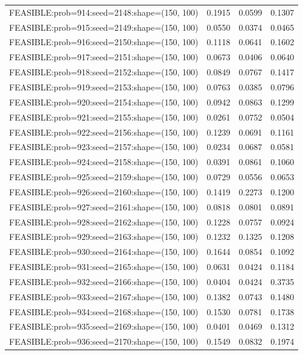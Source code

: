 \begin{longtable}{lccc}
FEASIBLE:prob=914:seed=2148:shape=(150, 100) & 0.1915 & 0.0599 & 0.1307 \\
FEASIBLE:prob=915:seed=2149:shape=(150, 100) & 0.0550 & 0.0374 & 0.0465 \\
FEASIBLE:prob=916:seed=2150:shape=(150, 100) & 0.1118 & 0.0641 & 0.1602 \\
FEASIBLE:prob=917:seed=2151:shape=(150, 100) & 0.0673 & 0.0406 & 0.0640 \\
FEASIBLE:prob=918:seed=2152:shape=(150, 100) & 0.0849 & 0.0767 & 0.1417 \\
FEASIBLE:prob=919:seed=2153:shape=(150, 100) & 0.0763 & 0.0385 & 0.0796 \\
FEASIBLE:prob=920:seed=2154:shape=(150, 100) & 0.0942 & 0.0863 & 0.1299 \\
FEASIBLE:prob=921:seed=2155:shape=(150, 100) & 0.0261 & 0.0752 & 0.0504 \\
FEASIBLE:prob=922:seed=2156:shape=(150, 100) & 0.1239 & 0.0691 & 0.1161 \\
FEASIBLE:prob=923:seed=2157:shape=(150, 100) & 0.0234 & 0.0687 & 0.0581 \\
FEASIBLE:prob=924:seed=2158:shape=(150, 100) & 0.0391 & 0.0861 & 0.1060 \\
FEASIBLE:prob=925:seed=2159:shape=(150, 100) & 0.0729 & 0.0556 & 0.0653 \\
FEASIBLE:prob=926:seed=2160:shape=(150, 100) & 0.1419 & 0.2273 & 0.1200 \\
FEASIBLE:prob=927:seed=2161:shape=(150, 100) & 0.0818 & 0.0801 & 0.0891 \\
FEASIBLE:prob=928:seed=2162:shape=(150, 100) & 0.1228 & 0.0757 & 0.0924 \\
FEASIBLE:prob=929:seed=2163:shape=(150, 100) & 0.1232 & 0.1325 & 0.1208 \\
FEASIBLE:prob=930:seed=2164:shape=(150, 100) & 0.1644 & 0.0854 & 0.1092 \\
FEASIBLE:prob=931:seed=2165:shape=(150, 100) & 0.0631 & 0.0424 & 0.1184 \\
FEASIBLE:prob=932:seed=2166:shape=(150, 100) & 0.0404 & 0.0424 & 0.3735 \\
FEASIBLE:prob=933:seed=2167:shape=(150, 100) & 0.1382 & 0.0743 & 0.1480 \\
FEASIBLE:prob=934:seed=2168:shape=(150, 100) & 0.1530 & 0.0781 & 0.1738 \\
FEASIBLE:prob=935:seed=2169:shape=(150, 100) & 0.0401 & 0.0469 & 0.1312 \\
FEASIBLE:prob=936:seed=2170:shape=(150, 100) & 0.1549 & 0.0832 & 0.1974 \\

\end{longtable}
